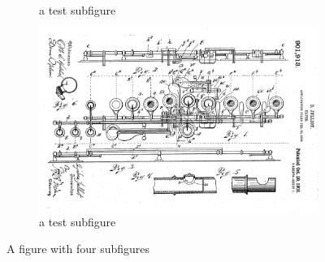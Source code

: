 \begin{figure}[!htbp]
{\begin{subfigure}[b]{.6\textwidth}
			\caption{a test subfigure}
		\end{subfigure}%
		\begin{subfigure}[b]{.6\textwidth}
			\centering
			\includegraphics[width=.95\textwidth]{gfx/06_visual_representation/Julliot_patent.png}
			\caption{a test subfigure}
		\end{subfigure}%
	}
	\caption{A figure with four subfigures}
\end{figure}


